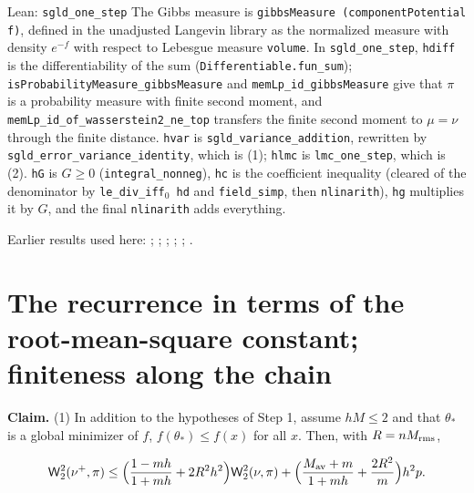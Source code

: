 \documentclass[11pt,a4paper]{article}
\begin{document}
\begin{leanbox}{Lean: \texttt{sgld\_\allowbreak{}one\_\allowbreak{}step}}
The Gibbs measure is \texttt{gibbs\allowbreak{}Measure (component\allowbreak{}Potential f)}, defined in the unadjusted Langevin library as the normalized measure with density \(e^{-f}\) with respect to Lebesgue measure \texttt{volume}. In \texttt{sgld\_\allowbreak{}one\_\allowbreak{}step}, \texttt{hdiff} is the differentiability of the sum (\texttt{Differentiable.\allowbreak{}fun\_\allowbreak{}sum}); \texttt{is\allowbreak{}Probability\allowbreak{}Measure\_\allowbreak{}gibbs\allowbreak{}Measure} and \texttt{mem\allowbreak{}Lp\_\allowbreak{}id\_\allowbreak{}gibbs\allowbreak{}Measure} give that \(\pi\) is a probability measure with finite second moment, and \texttt{mem\allowbreak{}Lp\_\allowbreak{}id\_\allowbreak{}of\_\allowbreak{}wasserstein2\_\allowbreak{}ne\_\allowbreak{}top} transfers the finite second moment to \(\mu=\nu\) through the finite distance. \texttt{hvar} is \texttt{sgld\_\allowbreak{}variance\_\allowbreak{}addition}, rewritten by \texttt{sgld\_\allowbreak{}error\_\allowbreak{}variance\_\allowbreak{}identity}, which is (1); \texttt{hlmc} is \texttt{lmc\_\allowbreak{}one\_\allowbreak{}step}, which is (2). \texttt{h\allowbreak{}G} is \(G\ge0\) (\texttt{integral\_\allowbreak{}nonneg}), \texttt{hc} is the coefficient inequality (cleared of the denominator by \texttt{le\_\allowbreak{}div\_\allowbreak{}iff\ensuremath{{}_{0}} hd} and \texttt{field\_\allowbreak{}simp}, then \texttt{nlinarith}), \texttt{hg} multiplies it by \(G\), and the final \texttt{nlinarith} adds everything.
\end{leanbox}


Earlier results used here: \cite[Section~3.17.3]{LangevinLean2026ULASC}; \cite[Section~3.17.4]{LangevinLean2026ULASC}; \cite[Section~3.21.1]{LangevinLean2026ULASC}; \cite[Section~3.26.13]{LangevinLean2026ULASC}; \cite[Section~3.26.15]{LangevinLean2026ULASC}; \cite[Section~3.26.3]{LangevinLean2026ULASC}.

\section{\texorpdfstring{The recurrence in terms of the root-mean-square constant; finiteness along the chain}{The recurrence in terms of the root-mean-square constant; finiteness along the chain}}


\textbf{Claim.} (1) In addition to the hypotheses of Step 1, assume \(hM\le2\) and that \(\theta_*\) is a global minimizer of \(f\), \(f(\theta_*)\le f(x)\) for all \(x\). Then, with \(R=nM_{\rm rms}\),


\[\mathsf W_2^2(\nu^+,\pi)\le\Bigl(\frac{1-mh}{1+mh}+2R^2h^2\Bigr)\mathsf W_2^2(\nu,\pi)+\Bigl(\frac{M_{\rm av}+m}{1+mh}+\frac{2R^2}m\Bigr)h^2p.\]
\end{document}
